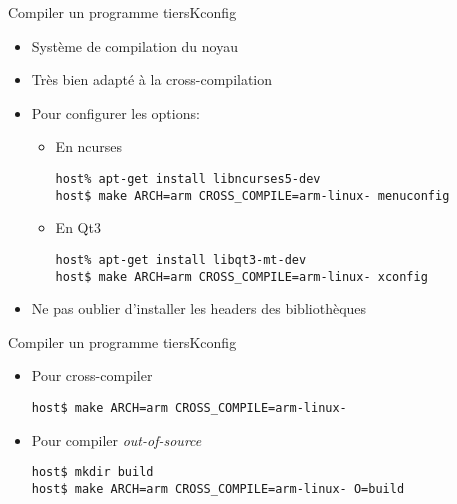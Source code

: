 \begin{frame}[fragile=singleslide]{Compiler un programme tiers}{Kconfig}
  \begin{itemize}
  \item Système de compilation du noyau
  \item Très bien adapté à la cross-compilation
  \item   Pour   configurer   les  options:
    \begin{itemize}    
    \item En ncurses
\begin{lstlisting}
host% apt-get install libncurses5-dev
host$ make ARCH=arm CROSS_COMPILE=arm-linux- menuconfig
\end{lstlisting} %
    \item En Qt3
\begin{lstlisting}
host% apt-get install libqt3-mt-dev
host$ make ARCH=arm CROSS_COMPILE=arm-linux- xconfig
\end{lstlisting} %
    \end{itemize}
  \item Ne pas oublier d'installer les headers des bibliothèques
  \end{itemize}
\end{frame}

\begin{frame}[fragile=singleslide]{Compiler un programme tiers}{Kconfig}
  \begin{itemize}
  \item Pour cross-compiler
\begin{lstlisting}
host$ make ARCH=arm CROSS_COMPILE=arm-linux-
\end{lstlisting} %
  \item Pour compiler \emph{out-of-source}
\begin{lstlisting}
host$ mkdir build
host$ make ARCH=arm CROSS_COMPILE=arm-linux- O=build
\end{lstlisting} %
  \end{itemize}
\end{frame}

